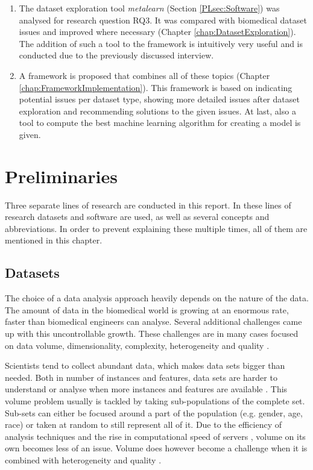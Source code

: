 \documentclass[10pt,a4paper]{report}
\begin{document}
\begin{enumerate}
		\item The dataset exploration tool \textit{metalearn} (Section \ref{PLsec:Software}) was analysed for research question RQ3. It was compared with biomedical dataset issues and improved where necessary (Chapter \ref{chap:DatasetExploration}). The addition of such a tool to the framework is intuitively very useful and is conducted due to the previously discussed interview.
		
		\item A framework is proposed that combines all of these topics (Chapter \ref{chap:FrameworkImplementation}). This framework is based on indicating potential issues per dataset type, showing more detailed issues after dataset exploration and  recommending solutions to the given issues. At last, also a tool to compute the best machine learning algorithm for creating a model is given.
	\end{enumerate} 
	
	\chapter{Preliminaries}
	\label{chap:Preliminaries}
		
	Three separate lines of research are conducted in this report. In these lines of research datasets and software are used, as well as several concepts and abbreviations. In order to prevent explaining these multiple times, all of them are mentioned in this chapter.
		
	\section{Datasets}
	\label{PLsec:Datasets}
	
	The choice of a data analysis approach heavily depends on the nature of the data. The amount of data in the biomedical world is growing at an enormous rate, faster than biomedical engineers can analyse. Several additional challenges came up with this uncontrollable growth. These challenges are in many cases focused on data volume, dimensionality, complexity, heterogeneity and quality \cite{chen2006medical, doi:10.1093/bib/bbx044}.
	
	Scientists tend to collect abundant data, which makes data sets bigger than needed. Both in number of instances and features, data sets are harder to understand or analyse when more instances and features are available \cite{chen2006medical}. This volume problem usually is tackled by taking sub-populations of the complete set. Sub-sets can either be focused around a part of the population (e.g. gender, age, race) or taken at random to still represent all of it. Due to the efficiency of analysis techniques and the rise in computational speed of servers \cite{blythe2008rise}, volume on its own becomes less of an issue. Volume does however become a challenge when it is combined with heterogeneity and quality \cite{Turkay2014, Holzinger2014}.
	
\end{document}
